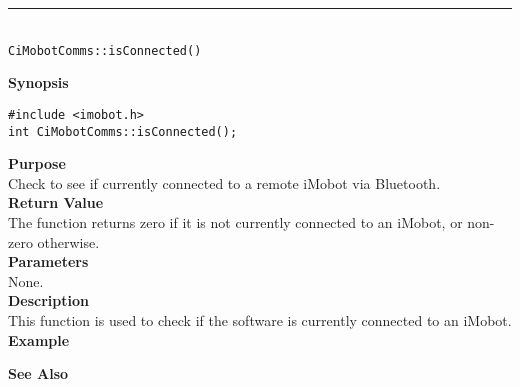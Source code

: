 \noindent
\vspace{5pt}
\rule{4.5in}{0.015in}\\
\noindent
{\LARGE \texttt{CiMobotComms::isConnected()}}\\
{}

\noindent
{\bf Synopsis}\\
\begin{verbatim}
#include <imobot.h>
int CiMobotComms::isConnected();
\end{verbatim}

\noindent
{\bf Purpose}\\
Check to see if currently connected to a remote iMobot via Bluetooth.\\

\noindent
{\bf Return Value}\\
The function returns zero if it is not currently connected to an iMobot, or non-zero otherwise.\\

\noindent
{\bf Parameters}\\
None.\\

\noindent
{\bf Description}\\
This function is used to check if the software is currently connected to
an iMobot.\\

\noindent
{\bf Example}\\
\noindent

\noindent
{\bf See Also}\\

